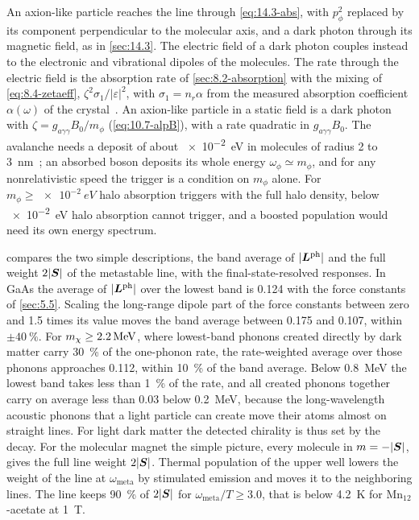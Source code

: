 An axion-like particle reaches the line through \cref{eq:14.3-abs}, with $p_\phi^2$ replaced by its component perpendicular to the molecular axis, and a dark photon through its magnetic field, as in \cref{sec:14.3}. The electric field of a dark photon couples instead to the electronic and vibrational dipoles of the molecules. The rate through the electric field is the absorption rate of \cref{sec:8.2-absorption} with the mixing of \cref{eq:8.4-zetaeff}, $\zeta^2\sigma_1/|\varepsilon|^2$, with $\sigma_1 = n_r\alpha$ from the measured absorption coefficient $\alpha(\omega)$ of the crystal~\cite[Eqs.~(9), (10)]{alves2026search}. An axion-like particle in a static field is a dark photon with $\zeta = g_{a\gamma\gamma}B_0/m_\phi$ (\cref{eq:10.7-alpB}), with a rate quadratic in $g_{a\gamma\gamma}B_0$. The avalanche needs a deposit of about \SI{e-2}{eV} in molecules of radius 2 to \SI{3}{nm}~\cite[Eq.~(6), Fig.~6]{alves2026search}; an absorbed boson deposits its whole energy $\omega_\phi \simeq m_\phi$, and for any nonrelativistic speed the trigger is a condition on $m_\phi$ alone. For $m_\phi \ge \SI{e-2}{eV}$ halo absorption triggers with the full halo density, below \SI{e-2}{eV} halo absorption cannot trigger, and a boosted population would need its own energy spectrum.

 compares the two simple descriptions, the band average of $|\bm{L}^{\mathrm{ph}}|$ and the full weight $2|\bm{S}|$ of the metastable line, with the final-state-resolved responses. In GaAs the average of $|\bm{L}^{\mathrm{ph}}|$ over the lowest band is 0.124 with the force constants of \cref{sec:5.5}. Scaling the long-range dipole part of the force constants between zero and 1.5 times its value moves the band average between 0.175 and 0.107, within $\pm\SI{40}{\percent}$. For $m_{\chi} \ge \SI{2.2}{MeV}$, where lowest-band phonons created directly by dark matter carry \SI{30}{\percent} of the one-phonon rate, the rate-weighted average over those phonons approaches 0.112, within \SI{10}{\percent} of the band average. Below \SI{0.8}{MeV} the lowest band takes less than \SI{1}{\percent} of the rate, and all created phonons together carry on average less than $0.03$ below \SI{0.2}{MeV}, because the long-wavelength acoustic phonons that a light particle can create move their atoms almost on straight lines. For light dark matter the detected chirality is thus set by the decay. For the molecular magnet the simple picture, every molecule in $m = -|\bm{S}|$, gives the full line weight $2|\bm{S}|$. Thermal population of the upper well lowers the weight of the line at $\omega_{\mathrm{meta}}$ by stimulated emission and moves it to the neighboring lines. The line keeps \SI{90}{\percent} of $2|\bm{S}|$ for $\omega_{\mathrm{meta}}/T \ge 3.0$, that is below \SI{4.2}{K} for Mn$_{12}$-acetate at \SI{1}{T}.

